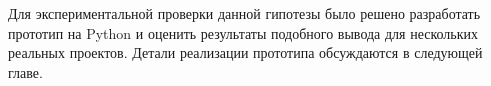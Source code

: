 Для экспериментальной проверки данной гипотезы было решено разработать
прототип на Python и оценить результаты подобного вывода для нескольких реальных
проектов. Детали реализации прототипа обсуждаются в следующей главе.






